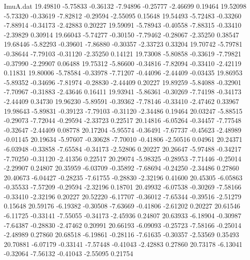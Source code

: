 \begin{filecontents}{ImuA.dat}
  19.49810   -5.75833   -0.36132   -7.94896   -0.25777   -2.46699    0.19464
  19.52098   -5.73320   -0.33619   -7.82812   -0.29594   -2.55095    0.15648
  19.54493   -5.72483   -0.33260   -7.88914   -0.34173   -2.42883    0.20227
  19.59091   -5.78943   -0.40558   -7.88315   -0.33410   -2.39829    0.30914
  19.66043   -5.74277   -0.30150   -7.79462   -0.28067   -2.35250    0.38547
  19.68446   -5.82293   -0.39601   -7.86880   -0.30357   -2.33723    0.33204
  19.70742   -5.79781   -0.38644   -7.79103   -0.31120   -2.35250    0.14121
  19.73008   -5.80858   -0.33619   -7.79821   -0.37990   -2.29907    0.06488
  19.75312   -5.86600   -0.34816   -7.82094   -0.33410   -2.42119    0.11831
  19.80006   -5.78584   -0.33978   -7.71207   -0.44096   -2.44409   -0.03435
  19.86953   -5.89352   -0.34696   -7.81974   -0.28830   -2.44409    0.20227
  19.89259   -5.84088   -0.32901   -7.70967   -0.31883   -2.43646    0.16411
  19.93941   -5.86361   -0.30269   -7.74198   -0.34173   -2.44409    0.34730
  19.96230   -5.89591   -0.39362   -7.78146   -0.33410   -2.47462    0.33967
  19.98643   -5.89831   -0.39123   -7.79103   -0.31120   -2.34486    0.19464
  20.03247   -5.88515   -0.29073   -7.72044   -0.29594   -2.33723    0.22517
  20.14816   -6.05264   -0.34457   -7.77548   -0.32647   -2.44409    0.08778
  20.17204   -5.95574   -0.36491   -7.67737   -0.45623   -2.48989   -0.01145
  20.19634   -5.97607   -0.30628   -7.70010   -0.41806   -2.50516    0.04961
  20.24371   -6.03948   -0.33858   -7.65584   -0.34173   -2.52806    0.20227
  20.26647   -5.97488   -0.34217   -7.70250   -0.31120   -2.41356    0.22517
  20.29074   -5.98325   -0.28953   -7.71446   -0.25014   -2.29907    0.24807
  20.35959   -6.03709   -0.35892   -7.68694   -0.24250   -2.34486    0.27860
  20.40673   -6.04427   -0.28235   -7.61755   -0.28830   -2.32196    0.41600
  20.45305   -6.05863   -0.35533   -7.57209   -0.29594   -2.32196    0.18701
  20.49932   -6.07538   -0.30269   -7.58166   -0.33410   -2.32196    0.20227
  20.52220   -6.17707   -0.36012   -7.65344   -0.39516   -2.51279    0.15648
  20.59176   -6.19382   -0.30508   -7.63669   -0.41806   -2.61202    0.20227
  20.61546   -6.11725   -0.33141   -7.55055   -0.34173   -2.45936    0.24807
  20.63933   -6.18904   -0.30987   -7.64387   -0.28830   -2.47462    0.20991
  20.66193   -6.09093   -0.25723   -7.58166   -0.25014   -2.48989    0.27860
  20.68518   -6.19861   -0.28116   -7.61635   -0.30357   -2.53569    0.35493
  20.70881   -6.07179   -0.33141   -7.57448   -0.41043   -2.42883    0.27860
  20.73178   -6.13041   -0.32064   -7.56132   -0.41043   -2.55095    0.21754

\end{filecontents}
